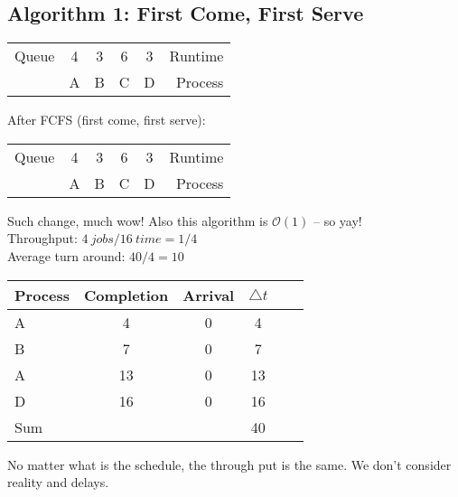 \documentclass[../base_file/cs1550_notes.tex]{subfiles}
\begin{document}
\subsection{Algorithm 1: First Come, First Serve}
\begin{center}
\begin{tabular}{l*{4}{c}r}
Queue		& 4 & 3 & 6 & 3 & Runtime\\
			& A & B & C & D & Process\\
\end{tabular}
\end{center}
After FCFS (first come, first serve):\\
\begin{center}
\begin{tabular}{l*{4}{c}r}
Queue		& 4 & 3 & 6 & 3 & Runtime\\
			& A & B & C & D & Process\\
\end{tabular}
\end{center}
Such change, much wow!
Also this algorithm is $\mathcal{O}(1)$ -- so yay!\\
Throughput: $4\ jobs/16\ time = 1/4$\\
Average turn around: $40/4 = 10$\\
\begin{center}
\begin{tabular}{l*{4}{c}r}
Process		& Completion	& Arrival	& $\bigtriangleup t$\\
\hline
A			& 4				& 0			& 4\\
B			& 7				& 0			& 7\\
A			& 13			& 0			& 13\\
D			& 16 			& 0			& 16\\
\hline
Sum			&			    &	 		& 40\\
\end{tabular}
\end{center}
No matter what is the schedule, the through put is the same.
We don't consider reality and delays.
\end{document}
